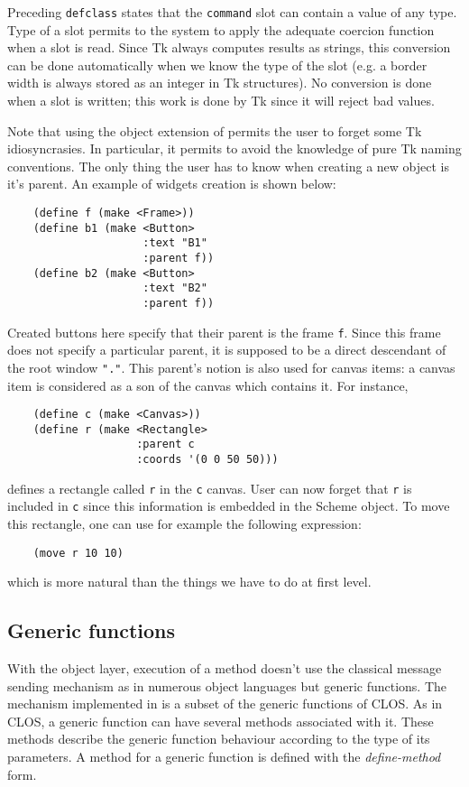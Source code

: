 Preceding {\tt defclass} states that the {\tt command} slot can contain a
value of any type. Type of a slot permits to the system to apply the adequate
coercion function when a slot is read. Since Tk always computes results as
strings, this conversion can be done automatically when we know the type of
the slot (e.g. a border width is always stored as an integer in Tk
structures). No conversion is done when a slot is written; this work is done
by Tk since it will reject bad values.

Note that using the object extension of \stk permits the user to forget some Tk
idiosyncrasies. In particular, it permits to avoid the knowledge of pure Tk
naming conventions. The only thing the user has to know when creating a new
object is it's parent. An example of widgets creation is shown below:
{\small 
\begin{verbatim}
    (define f (make <Frame>))
    (define b1 (make <Button> 
                     :text "B1" 
                     :parent f))
    (define b2 (make <Button> 
                     :text "B2" 
                     :parent f))
\end{verbatim}
}
Created buttons here specify that their parent is the frame {\tt f}. Since
this frame does not specify a particular parent, it is supposed to be a direct
descendant of the root window {\tt "."}. This parent's notion is also used for
canvas items: a canvas item is considered as a son of the canvas which contains
it. For instance,
{\small
\begin{verbatim}
    (define c (make <Canvas>))
    (define r (make <Rectangle> 
                    :parent c 
                    :coords '(0 0 50 50)))
\end{verbatim}
}
\noindent
defines a rectangle called {\tt r} in the {\tt c} canvas. User can now forget 
that {\tt r} is included in {\tt c} since this information is embedded in the 
Scheme object. To move this
rectangle, one can use for example the following expression:
{\small
\begin{verbatim}
    (move r 10 10)
\end{verbatim}
}
\noindent
which is more natural than the things we have to do at \stk first level.

\subsection{Generic functions}

With the \stk object layer, execution of a method doesn't use the classical
message sending mechanism as in numerous object languages but generic
functions. The mechanism implemented in \stk is a subset of the generic
functions of CLOS. As in CLOS, a generic function can have several methods
associated with it. These methods describe the generic function behaviour
according to the type of its parameters. A method for a generic function is
defined with the {\em define-method} form.

